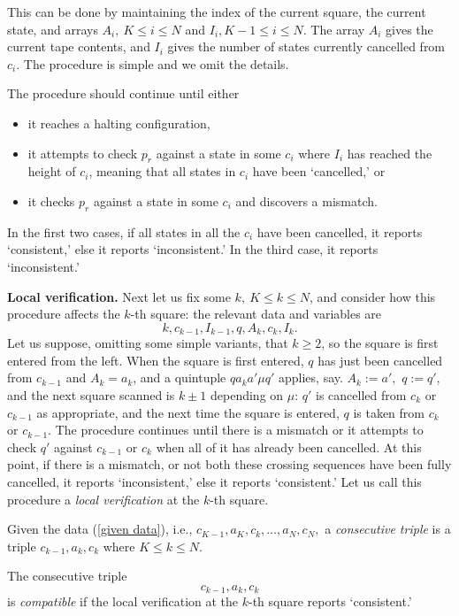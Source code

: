 This can be done by maintaining
the index of the current square, the current state,
and arrays $A_i,~K\leq i \leq N$ and $I_i, K-1 \leq i \leq N$.
The array $A_i$ gives the current tape contents, and
$I_i$ gives the number of states currently cancelled from
$c_i$. The procedure is simple and we omit the details.

The procedure should continue until either

\begin{itemize}
\item
it reaches a halting configuration,
\item
it attempts to check $p_r$ against a state in some $c_i$
where $I_i$ has reached the height of $c_i$, meaning
that all states in $c_i$ have been `cancelled,' or
\item
it checks $p_r$ against a state in some $c_i$ and
discovers a mismatch.
\end{itemize}

In the first two cases, if all states in all the $c_i$
have been cancelled, it reports `consistent,' else
it reports `inconsistent.'  In the third case, it
reports `inconsistent.'

\numpara
\label{par: local verification}
{\bf Local verification.}
Next let us fix some $k, ~ K\leq k \leq N$, and consider
how this procedure affects the $k$-th square: the relevant
data and variables are
$$ k, c_{k-1}, I_{k-1}, q, A_k, c_k, I_k.$$  Let us
suppose, omitting some simple variants,
that $k\geq 2$, so the square is first entered
from the left.  When the square is first entered,
$q$ has just been cancelled from $c_{k-1}$  and $A_k=a_k$,
and a quintuple $q a_k a' \mu q'$ applies, say.
$A_k:= a',$ $q:=q'$, and the next square scanned is $k\pm 1$
depending on $\mu$: $q'$ is cancelled from $c_k$ or $c_{k-1}$
as appropriate, and the next time the square is entered,
$q$ is taken from $c_{k}$ or $c_{k-1}$.  The procedure
continues until there is a mismatch
or it attempts to check $q'$ against $c_{k-1}$ or $c_k$
when all of it has already been cancelled.  At this
point, if there is a mismatch, or not both these
crossing sequences have been fully cancelled, it reports
`inconsistent,' else it reports `consistent.'  Let
us call this procedure a {\em local verification} at the
$k$-th square.

\begin{definition}
\label{def: consecutive triple}
\label{def: compatible}
Given the data (\ref{given data}), i.e.,
$
c_{K-1}, a_K, c_k, \ldots, a_N, c_N, 
$ a {\em consecutive triple} is a triple
$c_{k-1},a_k,c_k$ where $K\leq k \leq N$.

The consecutive triple
$$ c_{k-1}, a_k, c_{k} $$ is
{\em compatible} if the local verification at the $k$-th square
reports `consistent.'
\end{definition}

